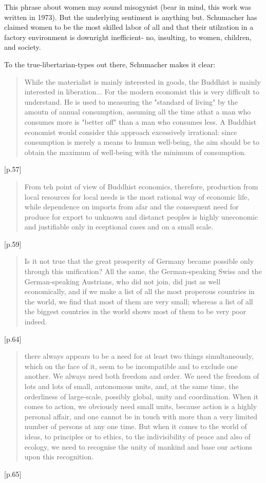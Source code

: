 This phrase about women may sound misogynist (bear in mind, this work was written in 1973). But the underlying sentiment is anything but. Schumacher has claimed women to be the most skilled labor of all and that their utilzation in a factory environment is downright inefficient- no, insulting, to women, children, and society.

To the true-libertarian-types out there, Schumacher makes it clear:

\begin{quote}
While the materialist is mainly interested in goods, the Buddhist is mainly interested in liberation... For the modern economist this is very difficult to understand. He is used to measuring the "standard of living" by the amoutn of annual consumption, assuming all the time athat a man who consumes more is "better off" than a man who consumes less. A Buddhist economist would consider this approach excessively irrational: since consumption is merely a means to human well-being, the aim should be to obtain the maximum of well-being with the minimum of consumption.
\end{quote} [p.57]

\begin{quote}
From teh point of view of Buddhist economics, therefore, production from local resources for local needs is the most rational way of economic life, while dependence on imports from afar and the consequent need for produce for export to unknown and distanct peoples is highly uneconomic and justifiable only in eceptional cases and on a small scale.
\end{quote} [p.59]

\begin{quote}
Is it not true that the great prosperity of Germany became possible only through this unification? All the same, the German-speaking Swiss and the German-speaking Austrians, who did not join, did just as well economically, and if we make a list of all the most properous countries in the world, we find that most of them are very small; whereas a list of all the biggest countries in the world shows most of them to be very poor indeed.
\end{quote} [p.64]

\begin{quote}
there always appears to be a need for at least two things simultaneously, which on the face of it, seem to be incompatible and to exclude one another. We always need both freedom and order. We need the freedom of lots and lots of small, autonomous units, and, at the same time, the orderliness of large-scale, possibly global, unity and coordination. When it comes to action, we obviously need small units, because action is a highly personal affair, and one cannot be in touch with more than a very limited number of persons at any one time. But when it comes to the world of ideas, to principles or to ethics, to the indivisibility of peace and also of ecology, we need to recognise the unity of mankind and base our actions upon this recognition.
\end{quote} [p.65]


